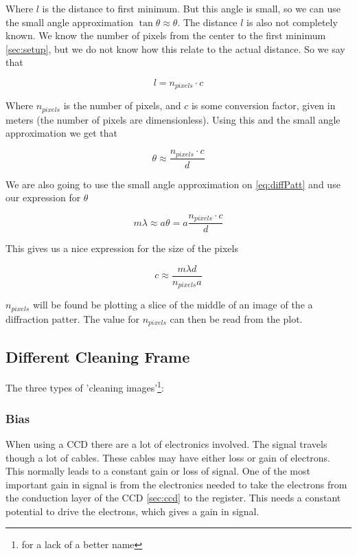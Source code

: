 \documentclass{emulateapj}
\begin{document}
Where $l$ is the distance to first minimum. But this angle is small, so we can use the small angle approximation $\tan \theta \approx \theta$. The distance $l$ is also not completely known. We know the number of pixels from the center to the first minimum \ref{sec:setup}, but we do not know how this relate to the actual distance. So we say that

\begin{equation}
l = n_{pixels}\cdot c
\end{equation}

Where $n_{pixels}$ is the number of pixels, and $c$ is some conversion factor, given in meters (the number of pixels are dimensionless). Using this and the small angle approximation we get that

\begin{equation}
\theta \approx \frac{n_{pixels}\cdot c}{d}
\end{equation}

We are also going to use the small angle approximation on \eqref{eq:diffPatt} and use our expression for $\theta$

\begin{equation}
m\lambda \approx a\theta = a\frac{n_{pixels}\cdot c}{d}
\end{equation}

This gives us a nice expression for the size of the pixels

\begin{equation}
c \approx \frac{m\lambda d}{n_{pixels}a}
\label{eq:pixelSize}
\end{equation}


$n_{pixels}$ will be found be plotting a slice of the middle of an image of the a diffraction patter. The value for $n_{pixels}$ can then be read from the plot.

\subsection{Different Cleaning Frame}

The three types of 'cleaning images'\footnote{for a lack of a better name}:

\subsubsection{Bias}
When using a CCD there are a lot of electronics involved. The signal travels though a lot of cables. These cables may have either loss or gain of electrons. This normally leads to a constant gain or loss of signal. One of the most important gain in signal is from the electronics needed to take the electrons from the conduction layer of the CCD \ref{sec:ccd} to the register. This needs a constant potential to drive the electrons, which gives a gain in signal.
\end{document}

